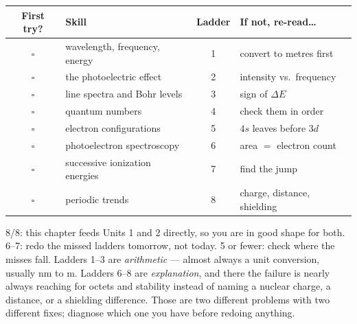 \documentclass{apchem-worksheet}
\begin{document}
\renewcommand{\arraystretch}{1.35}
\noindent\begin{tabular}{@{}c p{6.4cm} c p{4.6cm}@{}}
\toprule
\textbf{First try?} & \textbf{Skill} & \textbf{Ladder} &
  \textbf{If not, re-read\ldots}\\
\midrule
$\square$ & wavelength, frequency, energy & 1 & convert to metres first \\
$\square$ & the photoelectric effect & 2 & intensity vs.\ frequency \\
$\square$ & line spectra and Bohr levels & 3 & sign of $\Delta E$ \\
$\square$ & quantum numbers & 4 & check them in order \\
$\square$ & electron configurations & 5 & $4s$ leaves before $3d$ \\
$\square$ & photoelectron spectroscopy & 6 & area $=$ electron count \\
$\square$ & successive ionization energies & 7 & find the jump \\
$\square$ & periodic trends & 8 & charge, distance, shielding \\
\bottomrule
\end{tabular}

\begin{apcnote}
8/8: this chapter feeds Units 1 and 2 directly, so you are in good shape
for both. 6--7: redo the missed ladders tomorrow, not today.
5 or fewer: check where the misses fall. Ladders 1--3 are
\emph{arithmetic} --- almost always a unit conversion, usually nm to m.
Ladders 6--8 are \emph{explanation}, and there the failure is nearly
always reaching for octets and stability instead of naming a nuclear
charge, a distance, or a shielding difference. Those are two different
problems with two different fixes; diagnose which one you have before
redoing anything.
\end{apcnote}
\end{document}
